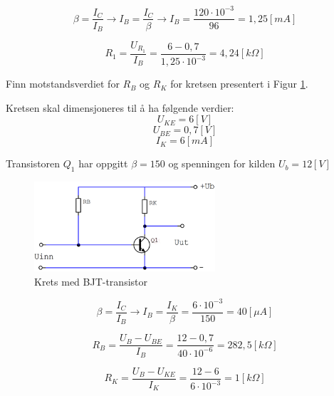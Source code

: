 \vspace{0.5cm} %

\begin{solution}[name=Løsningsforslag oppgave]
\[\beta = \frac{I_C}{I_B} \rightarrow I_B = \frac{I_C}{\beta} \rightarrow I_B= \frac{120 \cdot 10^{-3}}{96} = 1,25[mA]\]

\[R_1= \frac{U_{R_{1}}}{I_B} = \frac{6-0,7}{1,25 \cdot 10^{-3}}=4,24[k\Omega] \]

\end{solution}

\vspace{0.5cm} %

\begin{question}[name=Oppgave, topic=transBJT]
	
Finn motstandsverdiet for $R_B$ og $R_K$ for kretsen presentert i Figur \ref{fig:tranBJT6}.
	
Kretsen skal dimensjoneres til å ha følgende verdier:
\[U_{KE}=6[V]\]
\[U_{BE}=0,7[V]\]
\[I_K=6[mA]\]

Transistoren $Q_1$ har oppgitt $ \beta= 150$ og spenningen for kilden $ U_b=12[V]$
	
	\begin{figure}[H]
		\centering
		\includegraphics[width=0.6\textwidth]{transistor-BJT/figurer/krets6.png}
		\caption{Krets med BJT-transistor}
		\label{fig:tranBJT6}
	\end{figure}
	
\end{question}

\vspace{0.5cm} %

\begin{solution}[name=Løsningsforslag oppgave]
\[\beta = \frac{I_C}{I_B} \rightarrow I_B=\frac{I_K}{\beta}=\frac{6 \cdot 10^{-3}}{150} = 40[\mu A]\]

\[R_B=\frac{U_B-U_{BE}}{I_B}= \frac{12-0,7}{40 \cdot 10^{-6}}=282,5[k\Omega] \]

\[R_K=\frac{U_B-U_{KE}}{I_K}= \frac{12-6}{6 \cdot 10^{-3}}=1[k\Omega]\]

\end{solution}


